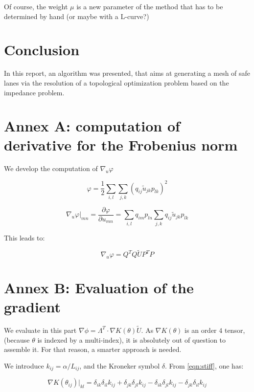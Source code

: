 \documentclass[11pt,a4paper]{article}  %
\begin{document}
Of course, the weight $\mu$ is a new parameter of the method that has to be determined by hand (or maybe with a L-curve?)

\section{Conclusion}

In this report, an algorithm was presented, that aims at generating a mesh of safe lanes via the resolution of a topological optimization problem based on the impedance problem.

\section*{Annex A: computation of derivative for the Frobenius norm}

We develop the computation of $\nabla_u\varphi$

\begin{equation}
\varphi = \dfrac{1}{2} \sum_{i,l} \sum_{j,k} \left(q_{ij} \tilde{u}_{jk} p_{lk}\right)^2
\end{equation}

\begin{equation}
\nabla_u\varphi|_{mn} = \dfrac{\partial\varphi}{\partial u_{mn}} = \sum_{i,l} q_{im}p_{ln} \sum_{j,k} q_{ij} \tilde{u}_{jk} p_{lk}
\end{equation}

This leads to:

\begin{equation}
\nabla_u\varphi = Q^TQ\tilde{U}P^TP
\end{equation}

\section*{Annex B: Evaluation of the gradient}

We evaluate in this part $\nabla\phi = \Lambda^T \cdot \nabla K(\theta) \tilde{U}$. As $\nabla K(\theta)$ is an order $4$ tensor, (because $\theta$ is indexed by a multi-index), it is absolutely out of question to assemble it. For that reason, a smarter approach is needed.

We introduce $k_{ij} = \alpha/L_{ij}$, and the Kroneker symbol $\delta$. From \eqref{eqn:stiff}, one has:

\begin{equation}
\nabla K(\theta_{ij})|_{kl} = \delta_{ik} \delta_{il} k_{ij} + \delta_{jk} \delta_{jl} k_{ij} - \delta_{ik} \delta_{jl} k_{ij} - \delta_{jk} \delta_{il} k_{ij}
\end{equation}
\end{document}
